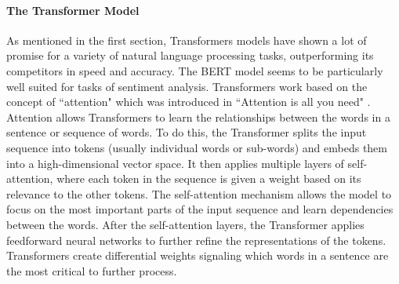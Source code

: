 \documentclass[12pt, letterpaper, titlepage]{article}
\begin{document}
\paragraph{The Transformer Model}
As mentioned in the first section, Transformers models have shown a lot of promise for a variety of natural language processing tasks, outperforming its competitors in speed and accuracy. The BERT model seems to be particularly well suited for tasks of sentiment analysis. Transformers work based on the concept of ``attention" which was introduced in ``Attention is all you need" \citep{vaswani2017attention} . Attention allows Transformers to learn the relationships between the words in a sentence or sequence of words. To do this, the Transformer splits the input sequence into tokens (usually individual words or sub-words) and embeds them into a high-dimensional vector space. It then applies multiple layers of self-attention, where each token in the sequence is given a weight based on its relevance to the other tokens. The self-attention mechanism allows the model to focus on the most important parts of the input sequence and learn dependencies between the words. After the self-attention layers, the Transformer applies feedforward neural networks to further refine the representations of the tokens. Transformers create differential weights signaling which words in a sentence are the most critical to further process. 	
\end{document}
